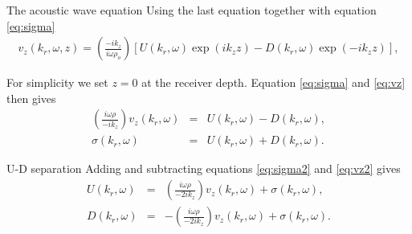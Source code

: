 \documentclass[xcolor=dvipsnames,notes]{beamer}
\begin{document}
\begin{frame}{The acoustic wave equation}
Using the last equation together with equation
\eqref{eq:sigma}
\begin{eqnarray}
  v_z(k_r,\omega,z) = \left(\frac{-ik_z}{i\omega\rho_o}\right)
                      \left[U(k_r,\omega)\exp(ik_z z) - D(k_r,\omega)\exp(-ik_z z)\right],
                               \label{eq:vz}
\end{eqnarray}

For simplicity we set $z=0$ at the receiver depth.
Equation \eqref{eq:sigma} and \eqref{eq:vz} then 
gives
\begin{eqnarray}
  \left(\frac{i\omega\rho}{-ik_z}\right)v_z(k_r,\omega) & = &
                      U(k_r,\omega) - D(k_r,\omega), \\
                               \label{eq:vz2}
   \sigma(k_r,\omega) & = & U(k_r,\omega) + D(k_r,\omega).
                               \label{eq:sigma2}
\end{eqnarray}
\end{frame}
\begin{frame}{U-D separation}
Adding and subtracting equations \eqref{eq:sigma2} and \eqref{eq:vz2} gives
\begin{eqnarray}
 U(k_r,\omega) & = & 
  \left(\frac{i\omega\rho}{-2ik_z}\right)v_z(k_r,\omega) + \sigma(k_r,\omega),\\
 D(k_r,\omega) & = & 
  -\left(\frac{i\omega\rho}{-2ik_z}\right)v_z(k_r,\omega) + \sigma(k_r,\omega).
\end{eqnarray}
\end{frame}
\end{document}
